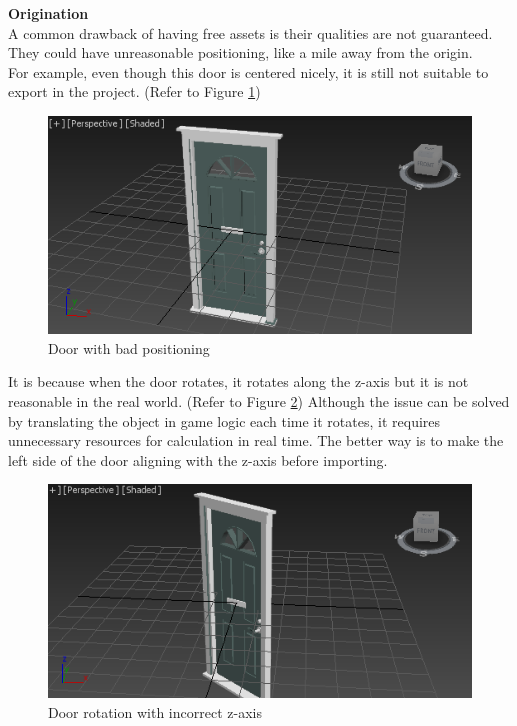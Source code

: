 \documentclass{article}
\begin{document}
\clearpage
\textbf{Origination} \\

A common drawback of having free assets is their qualities are not guaranteed. They could have unreasonable positioning, like a mile away from the origin.\\

For example, even though this door is centered nicely, it is still not suitable to export in the project. (Refer to Figure \ref{fig:3dscene2})\\

\begin{figure}[h]
\centering
\includegraphics[scale=0.6]{3dscene2.png}
\caption{Door with bad positioning}
\label{fig:3dscene2}
\end{figure}

\smallskip
It is because when the door rotates, it rotates along the z-axis but it is not reasonable in the real world. (Refer to Figure \ref{fig:3dscene3}) Although the issue can be solved by translating the object in game logic each time it rotates, it requires unnecessary resources for calculation in real time. The better way is to make the left side of the door aligning with the z-axis before importing.\\

\begin{figure}[h]
\centering
\includegraphics[scale=0.6]{3dscene3.png}
\caption{Door rotation with incorrect z-axis}
\label{fig:3dscene3}
\end{figure}
\end{document}

